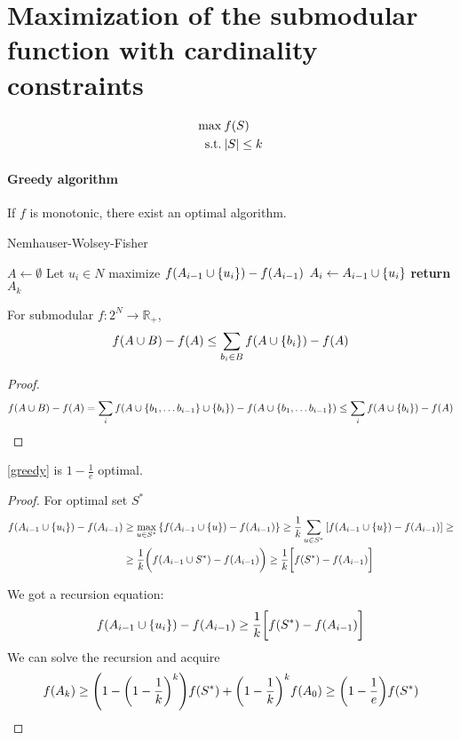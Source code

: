 \section{Maximization of the submodular function with cardinality constraints}
\begin{align}
\max \: & f(S)\\
\text{s.t.} \: & \abs{S} \leq k
\end{align}

\paragraph{Greedy algorithm}
If $f$ is monotonic, there exist an optimal algorithm.
\begin{algorithm}
	\caption{Nemhauser-Wolsey-Fisher}\label{greedy}
	\begin{algorithmic}[1]
		\State $A \gets \emptyset$
		\State Let $u_i\in N$ maximize $f(A_{i-1} \cup \qty{u_i}) - f(A_{i-1})$
		\State $ A_i \gets A_{i-1} \cup \qty{u_i}$
		\EndFor
		\State \textbf{return} $A_k$
		\EndProcedure
	\end{algorithmic}
\end{algorithm}
\begin{lemma}
	For submodular $f: 2^N \to \mathbb{R}_+$,
	\begin{align}
	f(A\cup B) - f(A) \leq \sum_{b_i \in B} f(A\cup \qty{b_i}) - f(A)
	\end{align}
	\begin{proof}
		\begin{align}
		f(A\cup B) - f(A) = \sum_i f(A \cup \qty{b_1, \dots b_{i-1}} \cup \qty{b_i} ) - f(A \cup \qty{b_1, \dots b_{i-1}})\leq \sum_i f(A \cup \qty{b_i}) - f(A)
		\end{align}
	\end{proof}
\end{lemma}
\begin{prop} \label{greedy_proof}
	\cref{greedy} is $1-\frac{1}{e}$ optimal.
	\begin{proof}
		For optimal set $S^*$
		\begin{align}
		f(A_{i-1} \cup \qty{u_i}) - f(A_{i-1})&\geq \max\limits_{u\in S^*} \qty{f(A_{i-1} \cup \qty{u}) - f(A_{i-1})} \geq \frac{1}{k} \sum_{u\in S^*} \qty[f(A_{i-1} \cup \qty{u}) - f(A_{i-1})] \geq\\&\geq \frac{1}{k} \qty\bigg(f(A_{i-1} \cup S^*) - f(A_{i-1})) \geq \frac{1}{k} \qty\bigg[f(S^*) - f(A_{i-1})]
		\end{align}
		
		We got a recursion equation:
		\begin{align}
		f(A_{i-1} \cup \qty{u_i}) - f(A_{i-1})\geq \frac{1}{k} \qty\bigg[f(S^*) - f(A_{i-1})]
		\end{align}
		We can solve the recursion and acquire
		\begin{align}
		f(A_{k}) \geq \qty(1-\qty(1-\frac{1}{k})^k)f(S^*) + \qty(1-\frac{1}{k})^k f(A_0) \geq \qty(1-\frac{1}{e}) f(S^*) 
		\end{align}
		
	\end{proof}
\end{prop}

